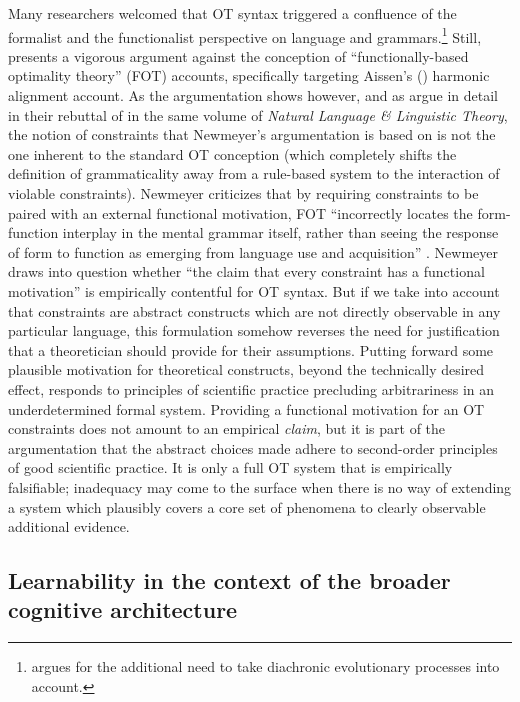\documentclass[output=paper,hidelinks]{langscibook}
\begin{document}
Many researchers welcomed that OT syntax triggered a confluence of the formalist and the functionalist perspective on language and grammars.\footnote{\citet{Haspelmath1999} argues for the additional need to take diachronic evolutionary processes into account.} Still, \citet{Newmeyer2002} presents a vigorous argument against the conception of ``functionally-based optimality theory'' (FOT) accounts, specifically targeting Aissen's (\citeyear{Aissen1999,Aissen2003}) harmonic alignment account. As the argumentation shows however, and as \citet{BresAiss02} argue in detail in their rebuttal of \citet{Newmeyer2002} in the same volume of \emph{Natural Language \& Linguistic Theory}, the notion of constraints that Newmeyer's argumentation is based on is not the one inherent to the standard OT conception (which completely shifts the definition of grammaticality away from a rule-based system to the interaction of violable constraints).
Newmeyer criticizes that by requiring constraints to be paired with an external functional motivation, FOT ``incorrectly locates the form-function interplay in the mental grammar itself, rather than seeing the response of form to function as emerging from language use and acquisition'' \citep[][43]{Newmeyer2002}.
Newmeyer draws into question whether ``the claim that every constraint has a functional motivation'' \citep[56]{Newmeyer2002} is empirically contentful for OT syntax. But if we take into account that constraints are abstract constructs which are not directly observable in any particular language, this formulation somehow reverses the need for justification that a theoretician should provide for their assumptions. Putting forward some plausible motivation for theoretical constructs, beyond the technically desired effect, responds to principles of scientific practice precluding arbitrariness in an underdetermined formal system. Providing a functional motivation for an OT constraints does not amount to an empirical \emph{claim}, but it is part of the argumentation that the abstract choices made adhere to second-order principles of good scientific practice. It is only a full OT system that is empirically falsifiable; inadequacy may come to the surface when there is no way of extending a system which plausibly covers a core set of phenomena to clearly observable additional evidence. %


\subsection{Learnability in the context of the broader cognitive architecture}
\label{sec:OT:cognitive-architecture}
\end{document}
